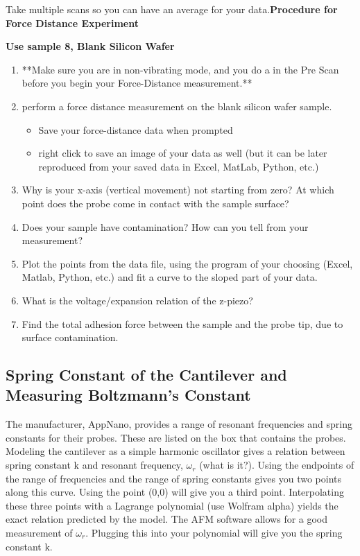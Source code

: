 \documentclass{../lab}
\begin{document}
Take multiple scans so you can have an average for your data.\textbf{Procedure for Force Distance Experiment}

\textbf{Use sample 8, Blank Silicon Wafer}

\begin{enumerate}
    \item **Make sure you are in non-vibrating mode, and you do a  in the Pre Scan before you begin your Force-Distance measurement.**

    \item perform a force distance measurement on the blank silicon wafer sample.

    \begin{itemize}
        \item Save your force-distance data when prompted

        \item right click to save an image of your data as well (but it can be later reproduced from your saved data in Excel, MatLab, Python, etc.)

    \end{itemize}

    \item Why is your x-axis (vertical movement) not starting from zero?  At which point does the probe come in contact with the sample surface?

    \item Does your sample have contamination? How can you tell from your measurement?

    \item Plot the points from the data file, using the program of your choosing (Excel, Matlab, Python, etc.) and fit a curve to the sloped part of your data.

    \item What is the voltage/expansion relation of the z-piezo?

    \item Find the total adhesion force between the sample and the probe tip, due to surface contamination.

\end{enumerate}

\subsection{Spring Constant of the Cantilever and Measuring Boltzmann's Constant}

The manufacturer, AppNano, provides a range of resonant frequencies and spring constants for their probes. These are listed on the box that contains the probes. Modeling the cantilever as a simple harmonic oscillator gives a relation between spring constant k and resonant frequency, $\omega_{r}$ (what is it?). Using the endpoints of the range of frequencies and the range of spring constants gives you two points along this curve. Using the point (0,0) will give you a third point. Interpolating these three points with a Lagrange polynomial (use Wolfram alpha) yields the exact relation predicted by the model. The AFM software allows for a good measurement of $\omega_{r}$. Plugging this into your polynomial will give you the spring constant k.
\end{document}
